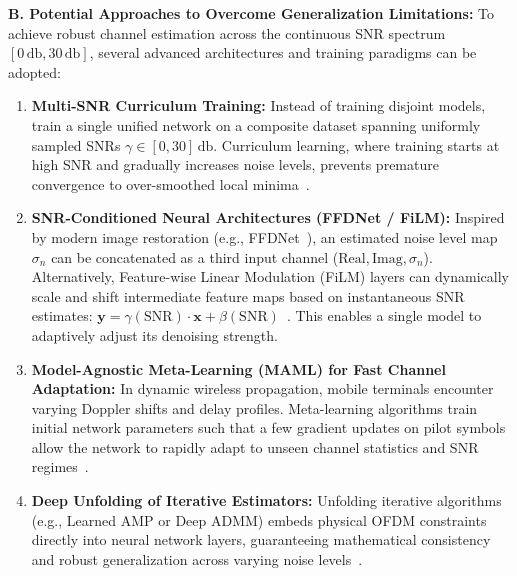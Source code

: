 \documentclass[10pt,a4paper]{article}
\begin{document}
\textbf{B. Potential Approaches to Overcome Generalization Limitations:}
To achieve robust channel estimation across the continuous SNR spectrum $[0\,\si{\decibel}, 30\,\si{\decibel}]$, several advanced architectures and training paradigms can be adopted:
\begin{enumerate}\setlength{\itemsep}{1.2pt}\setlength{\parskip}{0pt}
  \item \textbf{Multi-SNR Curriculum Training:} Instead of training disjoint models, train a single unified network on a composite dataset spanning uniformly sampled SNRs $\gamma \in [0, 30]\,\si{\decibel}$. Curriculum learning, where training starts at high SNR and gradually increases noise levels, prevents premature convergence to over-smoothed local minima~\cite{soltani2019deep}.
  \item \textbf{SNR-Conditioned Neural Architectures (FFDNet / FiLM):} Inspired by modern image restoration (e.g., FFDNet~\cite{zhang2018ffdnet}), an estimated noise level map $\sigma_n$ can be concatenated as a third input channel ($\text{Real}, \text{Imag}, \sigma_n$). Alternatively, Feature-wise Linear Modulation (FiLM) layers can dynamically scale and shift intermediate feature maps based on instantaneous SNR estimates: $\mathbf{y} = \gamma(\text{SNR}) \cdot \mathbf{x} + \beta(\text{SNR})$~\cite{perez2018film}. This enables a single model to adaptively adjust its denoising strength.
  \item \textbf{Model-Agnostic Meta-Learning (MAML) for Fast Channel Adaptation:} In dynamic wireless propagation, mobile terminals encounter varying Doppler shifts and delay profiles. Meta-learning algorithms train initial network parameters such that a few gradient updates on pilot symbols allow the network to rapidly adapt to unseen channel statistics and SNR regimes~\cite{park2020meta}.
  \item \textbf{Deep Unfolding of Iterative Estimators:} Unfolding iterative algorithms (e.g., Learned AMP or Deep ADMM) embeds physical OFDM constraints directly into neural network layers, guaranteeing mathematical consistency and robust generalization across varying noise levels~\cite{he2020model}.
\end{enumerate}

\clearpage

\end{document}
